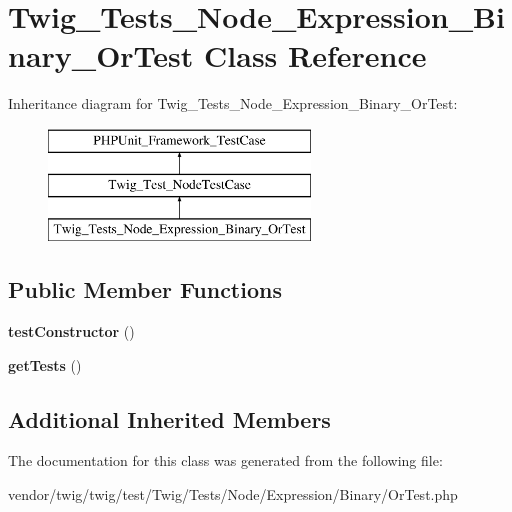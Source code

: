 \hypertarget{classTwig__Tests__Node__Expression__Binary__OrTest}{}\section{Twig\+\_\+\+Tests\+\_\+\+Node\+\_\+\+Expression\+\_\+\+Binary\+\_\+\+Or\+Test Class Reference}
\label{classTwig__Tests__Node__Expression__Binary__OrTest}
Inheritance diagram for Twig\+\_\+\+Tests\+\_\+\+Node\+\_\+\+Expression\+\_\+\+Binary\+\_\+\+Or\+Test\+:\begin{figure}[H]
\begin{center}
\leavevmode
\includegraphics[height=3.000000cm]{classTwig__Tests__Node__Expression__Binary__OrTest}
\end{center}
\end{figure}
\subsection*{Public Member Functions}
\begin{DoxyCompactItemize}
\item 
{\bfseries test\+Constructor} ()\hypertarget{classTwig__Tests__Node__Expression__Binary__OrTest_a6cf1a0dc2bc21630f70b0b92416753c1}{}\label{classTwig__Tests__Node__Expression__Binary__OrTest_a6cf1a0dc2bc21630f70b0b92416753c1}

\item 
{\bfseries get\+Tests} ()\hypertarget{classTwig__Tests__Node__Expression__Binary__OrTest_a62c5513aafbe11336cb618b60af36021}{}\label{classTwig__Tests__Node__Expression__Binary__OrTest_a62c5513aafbe11336cb618b60af36021}

\end{DoxyCompactItemize}
\subsection*{Additional Inherited Members}


The documentation for this class was generated from the following file\+:\begin{DoxyCompactItemize}
\item 
vendor/twig/twig/test/\+Twig/\+Tests/\+Node/\+Expression/\+Binary/Or\+Test.\+php\end{DoxyCompactItemize}
